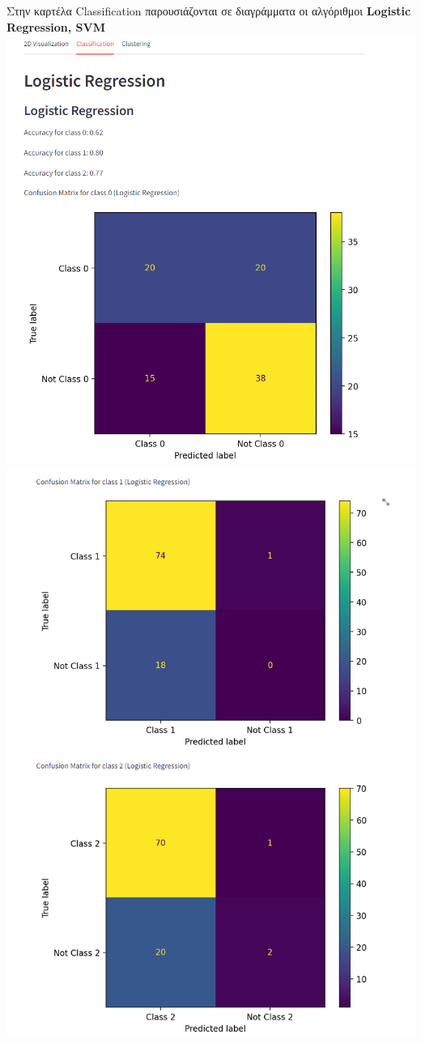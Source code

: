 \documentclass{article}
\begin{document}
 Στην καρτέλα Classification παρουσιάζονται σε διαγράμματα οι αλγόριθμοι \textbf{Logistic Regression, SVM}
\includegraphics[width=1.0\linewidth]{tab1_logistic_regression1.png}
\includegraphics[width=1.0\linewidth]{tab1_logistic_regression2.png}
\end{document}
